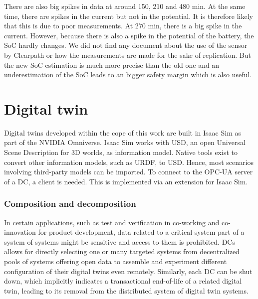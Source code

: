 \documentclass[conference]{IEEEtran}
\begin{document}
There are also big spikes in  data at around 150, 210 and 480 min.
At the same time, there are spikes in the current but not in the potential.
It is therefore likely that this is due to poor measurements.
At 270 min, there is  a big spike in the current. However, because there is also a spike in the potential of the battery, the  SoC hardly changes.
We did not find any document about the use of the sensor by Clearpath or how the measurements are made for the sake of replication.
But the new SoC estimation is much more precise than the old one and an underestimation of the SoC leads to an bigger safety margin which is also useful.
\section{Digital twin}
Digital twins developed within the cope of this work are built in Isaac Sim as part of the NVIDIA Omniverse. Isaac Sim works with USD, an open Universal Scene Description for 3D worlds, as information model. Native tools exist  to convert other information models, such as URDF, to USD. Hence, most scenarios involving third-party models can be  imported. To connect to the OPC-UA server of a DC, a client is needed. This is implemented via an extension for Isaac Sim.
\subsubsection{Composition and decomposition}
In certain applications, such as test and verification in co-working and co-innovation for product development, data related to a critical system part of a system of systems might be sensitive and  access to them is prohibited.  DCs allows for directly selecting one or many targeted systems from  decentralized pools of systems offering open data to assemble and experiment different configuration of their digital twins even remotely. Similarly, each  DC can be shut down, which implicitly  indicates a transactional end-of-life of a related digital twin,  leading to its removal from the distributed system of digital twin systems.  %

\end{document}
